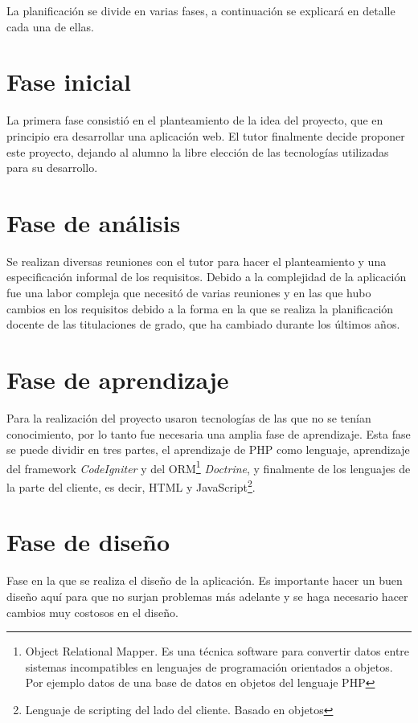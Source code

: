 
La planificación se divide en varias fases, a continuación se explicará en detalle cada una de ellas.

\section{Fase inicial}

La primera fase consistió en el planteamiento de la idea del proyecto, que en principio era desarrollar una aplicación web. El tutor finalmente decide proponer este proyecto, dejando al alumno la libre elección de las tecnologías utilizadas para su desarrollo.

\section{Fase de análisis}

Se realizan diversas reuniones con el tutor para hacer el planteamiento y una especificación informal de los requisitos. Debido a la complejidad de la aplicación fue una labor compleja que necesitó de varias reuniones y en las que hubo cambios en los requisitos debido a la forma en la que se realiza la planificación docente de las titulaciones de grado, que ha cambiado durante los últimos años.

\section{Fase de aprendizaje}

Para la realización del proyecto usaron tecnologías de las que no se tenían conocimiento, por lo tanto fue necesaria una amplia fase de aprendizaje. Esta fase se puede dividir en tres partes, el aprendizaje de PHP como lenguaje, aprendizaje del framework {\em CodeIgniter} y del ORM\footnote{Object Relational Mapper. Es una técnica software para convertir datos entre sistemas incompatibles en lenguajes de programación orientados a objetos. Por ejemplo datos de una base de datos en objetos del lenguaje PHP} {\em Doctrine}, y finalmente de los lenguajes de la parte del cliente, es decir, HTML y JavaScript\footnote{Lenguaje de scripting del lado del cliente. Basado en objetos}.

\section{Fase de diseño}

Fase en la que se realiza el diseño de la aplicación. Es importante hacer un buen diseño aquí para que no surjan problemas más adelante y se haga necesario hacer cambios muy costosos en el diseño.

